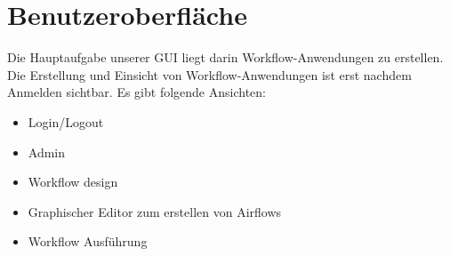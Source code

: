 \chapter{Benutzeroberfläche}
    Die Hauptaufgabe unserer GUI liegt darin Workflow-Anwendungen zu erstellen. Die Erstellung und Einsicht von Workflow-Anwendungen ist erst nachdem Anmelden sichtbar. Es gibt folgende Ansichten:
    \begin{itemize}
        \item Login/Logout
        \item Admin
        \item Workflow design
        \item Graphischer Editor zum erstellen von Airflows
        \item Workflow Ausführung
    \end{itemize}
 
